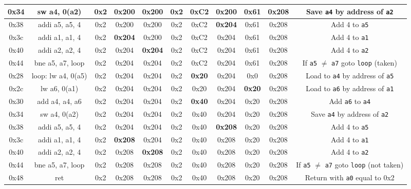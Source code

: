\documentclass[12pt, a4paper]{article}
\begin{document}
\begin{landscape}
\begin{table}[!ht]
\begin{tabular}{c | c c c c c c c c c | c}
\hline  0x34 & sw a4, 0(a2)     & 0x2 & 0x200 & 0x200 & 0x2 & 0xC2 & 0x200 & 0x61 & 0x208 & Save \texttt{a4} by address of \texttt{a2}  \\
\hline  0x38 & addi a5, a5, 4     & 0x2 & 0x200 & 0x200 & 0x2 & 0xC2 & \textbf{0x204} & 0x61 & 0x208 &  Add 4 to \texttt{a5}\\
\hline  0x3c & addi a1, a1, 4    & 0x2 & \textbf{0x204} & 0x200 & 0x2 & 0xC2 & 0x204 & 0x61 & 0x208 &   Add 4 to \texttt{a1}\\
\hline  0x40 & addi a2, a2, 4    & 0x2 & 0x204 & \textbf{0x204} & 0x2 & 0xC2 & 0x204 & 0x61 & 0x208 & Add 4 to \texttt{a2}\\
\hline  0x44 & bne a5, a7, loop     & 0x2 & 0x204 & 0x204 & 0x2 & 0xC2 & 0x204 & 0x61 & 0x208 &  If \texttt{a5} $\neq$ \texttt{a7} goto \texttt{loop} (taken)\\
\hline  0x28 & loop: lw a4, 0(a5)     & 0x2 & 0x204 & 0x204 & 0x2 & \textbf{0x20} & 0x204 & 0x0 & 0x208 & Load to \texttt{a4} by address of \texttt{a5}\\
\hline  0x2c & lw a6, 0(a1)     & 0x2 & 0x204 & 0x204 & 0x2 & 0x20 & 0x204 & \textbf{0x20} & 0x208 & Load to \texttt{a6} by address of \texttt{a1}\\
\hline  0x30 & add a4, a4, a6     & 0x2 & 0x204 & 0x204 & 0x2 & \textbf{0x40} & 0x204 & 0x20 & 0x208 & Add \texttt{a6} to \texttt{a4}\\
\hline  0x34 & sw a4, 0(a2)     & 0x2 & 0x204 & 0x204 & 0x2 & 0x40 & 0x204 & 0x20 & 0x208 & Save \texttt{a4} by address of \texttt{a2}  \\
\hline  0x38 & addi a5, a5, 4     & 0x2 & 0x204 & 0x204 & 0x2 & 0x40 & \textbf{0x208} & 0x20 & 0x208 &  Add 4 to \texttt{a5}\\
\hline  0x3c & addi a1, a1, 4    & 0x2 & \textbf{0x208} & 0x204 & 0x2 & 0x40 & 0x208 & 0x20 & 0x208 &   Add 4 to \texttt{a1}\\
\hline  0x40 & addi a2, a2, 4    & 0x2 & 0x208 & \textbf{0x208} & 0x2 & 0x40 & 0x208 & 0x20 & 0x208 & Add 4 to \texttt{a2}\\
\hline  0x44 & bne a5, a7, loop     & 0x2 & 0x208 & 0x208 & 0x2 & 0x40 & 0x208 & 0x20 & 0x208 &  If \texttt{a5} $\neq$ \texttt{a7} goto \texttt{loop} (not taken)\\
\hline 0x48 & ret & 0x2 & 0x208 & 0x208 & 0x2 & 0x40 & 0x208 & 0x20 & 0x208 & Return with \texttt{a0} equal to 0x2
\end{tabular}
\end{table}
\end{landscape}
\end{document}
